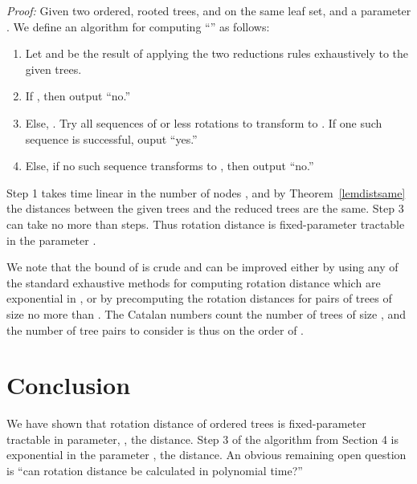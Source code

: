\documentclass[12pt]{article}
\begin{document}
{\em Proof:}
Given two ordered, rooted trees,  and  on the
same leaf set, and a parameter .  We define an algorithm
for computing ``'' as follows:
\begin{enumerate}
\itemsep 0pt
	\item Let  and  be the result of applying 
		the two reductions rules exhaustively to the given trees. 
	\item If , then output ``{\sc no}.''
	\item Else, .  Try all sequences of 
		or less rotations to transform  to .
		If one such sequence is successful, ouput ``{\sc yes}.''
	\item Else, if no such sequence transforms  to , 
		then output ``{\sc no}.''
\end{enumerate}
 

Step 1 takes time linear in the number of nodes , and by Theorem~\ref{lemdistsame} the distances between the given trees and the
reduced trees are the same.  Step 3 can take no more than  steps.  Thus rotation distance is 
fixed-parameter tractable in the parameter .
\hfill 

\bigskip

We note that the bound of  is crude and can be improved either by using any of the standard exhaustive methods for computing rotation distance which are exponential in , or by precomputing the rotation distances for pairs of trees of size no more than .  The Catalan numbers  count the number of trees of size , and  the number of tree pairs to consider is thus on the order of .

\section{Conclusion } 

We have shown that rotation distance of ordered trees is
fixed-parameter tractable in parameter, , the distance.
Step 3 of the algorithm from Section 4 is exponential in the parameter , the
distance.
An obvious remaining open question is ``can rotation distance be calculated in 
polynomial time?''
\end{document}
